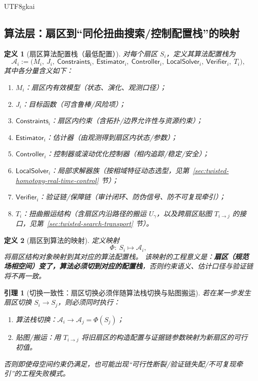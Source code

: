 \documentclass[12pt]{article}
\newtheorem{definition}{定义}[section]
\newtheorem{lemma}{引理}[section]
\begin{document}
\begin{CJK*}{UTF8}{gkai}
\subsection{算法层：扇区到“同伦扭曲搜索/控制配置栈”的映射}
\label{sec:algorithm-layer-sector-to-stack}

\begin{definition}[扇区算法配置栈（最低配置）]
对每个扇区 $S_i$，定义其算法配置栈为
\[
  \mathcal{A}_i
  :=
  \bigl(
    M_i,\ J_i,\ \mathsf{Constraints}_i,\ \mathsf{Estimator}_i,\ \mathsf{Controller}_i,\ \mathsf{LocalSolver}_i,\
      \mathsf{Verifier}_i,\ T_i
  \bigr),
\]
其中各分量含义如下：
\begin{enumerate}
  \item $M_i$：扇区内有效模型（状态、演化、观测口径）；
  \item $J_i$：目标函数（可含鲁棒/风险项）；
  \item $\mathsf{Constraints}_i$：扇区内约束（含拓扑/边界允许性与资源约束）；
  \item $\mathsf{Estimator}_i$：估计器（由观测得到扇区内状态/参数）；
  \item $\mathsf{Controller}_i$：控制器或滚动优化控制器（相内追踪/稳定/安全）；
  \item $\mathsf{LocalSolver}_i$：局部求解器族（按相域特征动态选型，见第~\ref{sec:twisted-homotopy-real-time-control} 节）；
  \item $\mathsf{Verifier}_i$：验证链/保障链（审计闭环、防伪信号、防不可复现牵引）；
  \item $T_i$：扭曲搬运结构（含扇区内沿路径的搬运 $U_\gamma$，以及跨扇区贴图 $T_{i\to j}$ 的接口，见第~\ref{sec:twisted-search-transport} 节）。
\end{enumerate}
\end{definition}

\begin{definition}[扇区到算法的映射]
定义映射
\[
  \Phi:\ S_i\longmapsto \mathcal{A}_i,
\]
将扇区结构对象映射到其对应的算法配置栈。
该映射的工程意义是：\textbf{扇区（规范场相空间）变了，算法必须切到对应的配置栈}，否则约束语义、估计口径与验证链将不再一致。
\end{definition}

\begin{lemma}[切换一致性：扇区切换必须伴随算法栈切换与贴图搬运]
\label{lem:sector-switch-implies-stack-switch-and-transport}
若在某一步发生扇区切换 $S_i\to S_j$，则必须同时执行：
\begin{enumerate}
  \item 算法栈切换：$\mathcal{A}_i\to\mathcal{A}_j=\Phi(S_j)$；
  \item 贴图/搬运：用 $T_{i\to j}$ 将旧扇区的构造配置与证据链参数映射为新扇区的可行初值。
\end{enumerate}
否则即使母空间约束仍满足，也可能出现“可行性断裂/验证链失配/不可复现牵引”的工程失败模式。
\end{lemma}


\end{CJK*}
\end{document}
